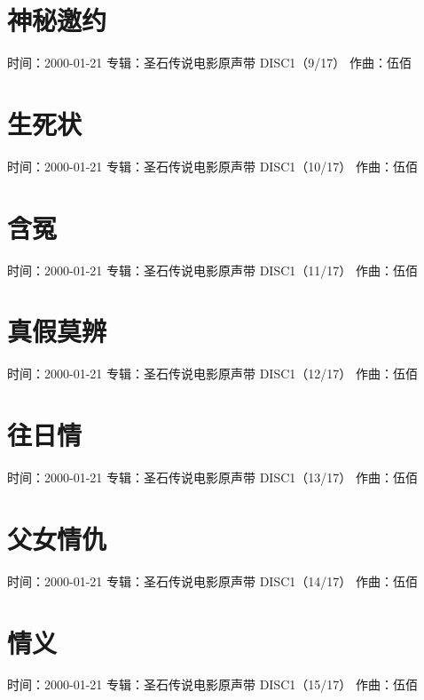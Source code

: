 \documentclass[UTF8,a4paper,oneside,twocolumn,12pt]{ctexbook}
\newcommand{\infopair}[2]{\textbullet #1：#2}
\newcommand{\zq}[1][伍佰]{\infopair{作曲}{#1}}
\newcommand{\zj}[1]{\infopair{专辑}{#1}}
\newcommand{\sj}[1]{\infopair{时间}{#1}}
\newenvironment{info}{\begin{flushleft}\kaishu
	}
	{\end{flushleft}\normalsize\yahei\par}
\begin{document}
\section{神秘邀约}
\begin{info}
	\sj{2000-01-21}
	\zj{圣石传说电影原声带 DISC1（9/17）}
	\zq
\end{info}

\section{生死状}
\begin{info}
	\sj{2000-01-21}
	\zj{圣石传说电影原声带 DISC1（10/17）}
	\zq
\end{info}

\section{含冤}
\begin{info}
	\sj{2000-01-21}
	\zj{圣石传说电影原声带 DISC1（11/17）}
	\zq
\end{info}

\section{真假莫辨}
\begin{info}
	\sj{2000-01-21}
	\zj{圣石传说电影原声带 DISC1（12/17）}
	\zq
\end{info}

\section{往日情}
\begin{info}
	\sj{2000-01-21}
	\zj{圣石传说电影原声带 DISC1（13/17）}
	\zq
\end{info}

\section{父女情仇}
\begin{info}
	\sj{2000-01-21}
	\zj{圣石传说电影原声带 DISC1（14/17）}
	\zq
\end{info}

\section{情义}
\begin{info}
	\sj{2000-01-21}
	\zj{圣石传说电影原声带 DISC1（15/17）}
	\zq
\end{info}
\end{document}
